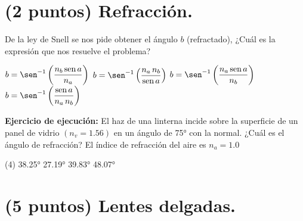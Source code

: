 \documentclass[12pt, letter]{exam}
\begin{document}
\begin{questions}
{
    }

    \newpage

    \section{(2 puntos) Refracción.}

    \question De la ley de Snell se nos pide obtener el ángulo $b$ (refractado), ¿Cuál es la expresión que nos resuelve el problema?
    \begin{multicols}{2}
    \begin{tasks}
        \task $ b = \sen^{-1} \left(\dfrac{n_{b} \, \text{sen} \, a}{n_{a}} \right)$
        \task $ b = \sen^{-1} \left(\dfrac{n_{a} \, n_{b}}{\text{sen} \, a} \right)$
        \task $ b = \sen^{-1} \left(\dfrac{n_{a} \, \text{sen} \, a}{n_{b}} \right)$
        \task $ b = \sen^{-1} \left(\dfrac{\text{sen} \, a}{n_{a} \, n_{b}} \right)$
    \end{tasks}
    \end{multicols}
    \question \label{Ejercicio_06} \textbf{Ejercicio de ejecución: } El haz de una linterna incide sobre la superficie de un panel de vidrio $(n_{v} = 1.56)$ en un ángulo de \ang{75} con la normal. ¿Cuál es el ángulo de refracción? El índice de refracción del aire es $n_{a} = 1.0$
    \begin{tasks}(4)
        \task \ang{38.25}
        \task \ang{27.19}
        \task \ang{39.83}
        \task \ang{48.07}
    \end{tasks}

    \section{(5 puntos) Lentes delgadas.}


\end{questions}
\end{document}
